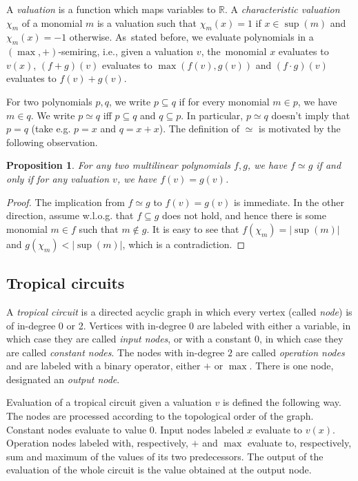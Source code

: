 \documentclass[11pt,a4paper]{article}
\newtheorem{prop}[lemma]{Proposition}
\begin{document}
A \emph{valuation} is a function which maps variables to $\mathbb{R}$.
A \emph{characteristic valuation $\chi_m$} of a monomial $m$ is a valuation such that $\chi_m(x) = 1$ if $x \in \sup(m)$ and $\chi_m(x) = -1$ otherwise. As~stated before, we evaluate polynomials in a $(\max, +)$-semiring, i.e., given a valuation $v$, the~monomial $x$ evaluates to $v(x)$, $(f + g)(v)$ evaluates to $\max(f(v), g(v))$ and $(f \cdot g)(v)$ evaluates to $f(v) + g(v)$.

For two polynomials $p, q$, we write $p \subseteq q$ if for every monomial $m \in p$, we have $m \in q$. We write $p \simeq q$ iff $p \subseteq q$ and $q \subseteq p$. In particular, $p \simeq q$ doesn't imply that $p = q$ (take e.g. $p = x$ and $q = x + x$).
The definition of $\simeq$ is motivated by the following observation.

\begin{prop}\label{prop:poly_simeq}
    For any two multilinear polynomials $f, g$, we have $f \simeq g$ if and only if for any valuation $v$, we have $f(v) = g(v)$.
\end{prop}

\begin{proof}
    The implication from $f \simeq g$ to $f(v) = g(v)$ is immediate. In the other direction, assume w.l.o.g. that $f \subseteq g$ does not hold, and hence there is some monomial $m \in f$ such that $m \not\in g$.
    It is easy to see that $f(\chi_m) = |\sup(m)|$ and $g(\chi_m) < |\sup(m)|$, which is a contradiction.
\end{proof}


\subsection{Tropical circuits}

A \emph{tropical circuit} is a directed acyclic graph in which every vertex (called \emph{node}) is of in-degree 0 or 2. Vertices with in-degree 0 are labeled with either a variable, in which case they are called \emph{input nodes}, or with a constant $0$, in which case they are called \emph{constant nodes}. The nodes with in-degree $2$ are called \emph{operation nodes} and are labeled with a binary operator, either $+$ or $\max$. There is one node, designated an \emph{output node}.

Evaluation of a tropical circuit given a valuation $v$ is defined the following way. The nodes are processed according to the topological order of the graph. Constant nodes evaluate to value $0$. Input nodes labeled $x$ evaluate to $v(x)$. Operation nodes labeled with, respectively, $+$ and $\max$ evaluate to, respectively, sum and maximum of the values of its two predecessors. The output of the evaluation of the whole circuit is the value obtained at the output node.
\end{document}
